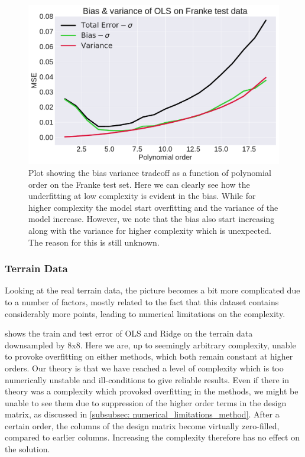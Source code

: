 \documentclass[10pt, twocolumn]{article}
\begin{document}
\begin{figure}[h!]
    \centering
    \includegraphics[scale=0.4]{../figs/BV_bootstrap_Franke_OLS.pdf}
    \caption{Plot showing the bias variance tradeoff as a function of polynomial order on the Franke test set. Here we can clearly see how the underfitting at low complexity is evident in the bias. While for higher complexity the model start overfitting and the variance of the model increase. However, we note that the bias also start increasing along with the variance for higher complexity which is unexpected. The reason for this is still unknown.}
    \label{fig:Boostrap_franke_ols}
\end{figure}

\subsubsection{Terrain Data}
Looking at the real terrain data, the picture becomes a bit more complicated due to a number of factors, mostly related to the fact that this dataset contains considerably more points, leading to numerical limitations on the complexity.

 shows the train and test error of OLS and Ridge on the terrain data downsampled by 8x8. Here we are, up to seemingly arbitrary complexity, unable to provoke overfitting on either methods, which both remain constant at higher orders. Our theory is that we have reached a level of complexity which is too numerically unstable and ill-conditions to give reliable results. Even if there in theory was a complexity which provoked overfitting in the methods, we might be unable to see them due to suppression of the higher order terms in the design matrix, as discussed in \cref{subsubsec: numerical_limitations_method}. After a certain order, the columns of the design matrix become virtually zero-filled, compared to earlier columns. Increasing the complexity therefore has no effect on the solution.
\end{document}
